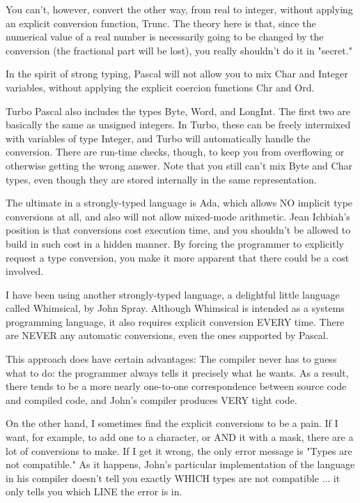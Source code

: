 You can't, however, convert the  other way, from real to integer, without applying an explicit  conversion  function, Trunc. The theory here is that, since  the numerical value of a real number is  necessarily  going  to  be  changed  by  the conversion  (the fractional  part will be lost), you really  shouldn't  do  it  in "secret."

In the spirit of strong typing, Pascal will not allow you  to mix Char  and  Integer   variables, without  applying  the  explicit coercion functions Chr and Ord.

Turbo Pascal also includes the  types  Byte, Word, and LongInt. The first two are basically the same as unsigned  integers. In Turbo, these can be freely intermixed  with  variables  of  type Integer, and  Turbo will automatically  handle  the  conversion. There are run-time  checks, though, to keep you from overflowing or otherwise getting the wrong  answer. Note that you still can't mix Byte and Char types, even though they  are  stored internally in the same representation.

The ultimate in a  strongly-typed  language  is Ada, which allows  NO   implicit  type  conversions at all, and also will not allow mixed-mode  arithmetic. Jean   Ichbiah's   position   is  that conversions cost  execution time, and you shouldn't be allowed to build in such cost in a hidden manner. By forcing the programmer to  explicitly  request  a  type  conversion, you  make it  more apparent that there could be a cost involved.

I have been using another strongly-typed  language, a delightful little  language  called  Whimsical, by  John  Spray. Although Whimsical is  intended as a systems programming language, it also requires explicit conversion EVERY time. There  are  NEVER any automatic conversions, even the ones supported by Pascal.

This approach does  have  certain advantages:  The compiler never has to guess what to do: the programmer always tells it precisely what  he  wants. As a result, there tends to be  a  more  nearly one-to-one correspondence between  source code and compiled code, and John's compiler produces VERY tight code.

On the other hand, I sometimes find the  explicit  conversions to be a pain. If I want, for example, to add one to a character, or AND it with a mask, there are a lot of conversions to make. If I get  it  wrong, the  only   error  message  is  "Types  are  not compatible."  As it happens, John's particular  implementation of the language in his compiler doesn't tell you exactly WHICH types are not compatible ... it only tells you which LINE the  error is in.

